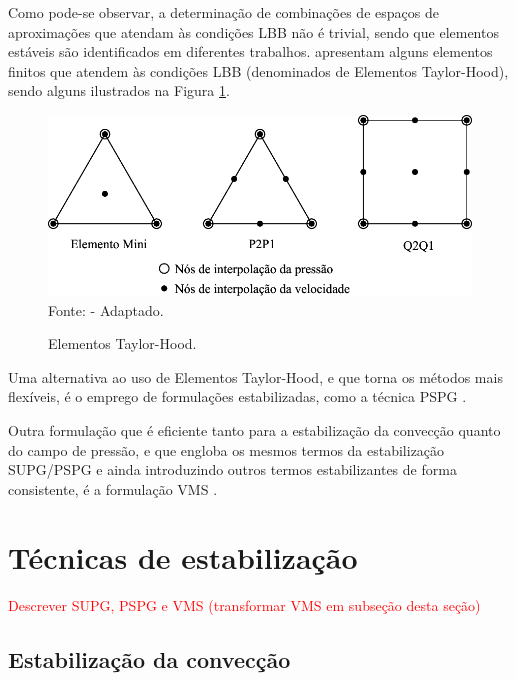 Como pode-se observar, a determinação de combinações de espaços de aproximações que atendam às condições LBB não é trivial, sendo que elementos estáveis são identificados em diferentes trabalhos.  apresentam alguns elementos finitos que atendem às condições LBB (denominados de Elementos Taylor-Hood), sendo alguns ilustrados na Figura \ref{fig:Taylor-Hood}.

\begin{figure}[h!]
    \centering
    \caption{Elementos Taylor-Hood.}
    \includegraphics[width=.65\linewidth]{Figuras/Taylor-Hood.pdf}
    \\Fonte:  - Adaptado.
    \label{fig:Taylor-Hood}
\end{figure}

Uma alternativa ao uso de Elementos Taylor-Hood, e que torna os métodos mais flexíveis, é o emprego de formulações estabilizadas, como a técnica PSPG \cite{tezduyar1991stabilized}.

Outra formulação que é eficiente tanto para a estabilização da convecção quanto do campo de pressão, e que engloba os mesmos termos da estabilização SUPG/PSPG e ainda introduzindo outros termos estabilizantes de forma consistente, é a formulação VMS \cite{bazilevs2013computational}.

\section{Técnicas de estabilização}\label{STAB}

\textcolor{red}{Descrever SUPG, PSPG e VMS (transformar VMS em subseção desta seção)}

\subsection{Estabilização da convecção}


